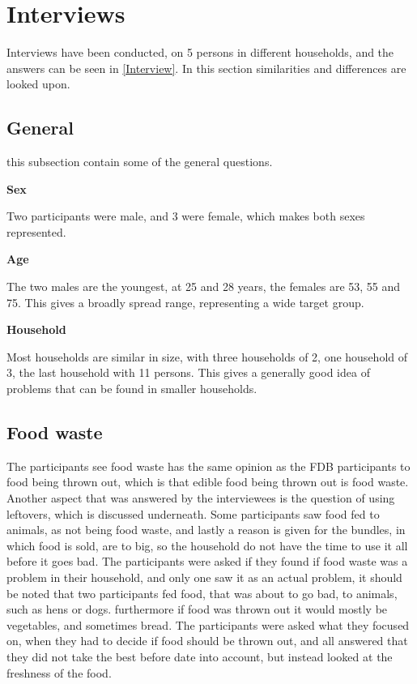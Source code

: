 \section{Interviews}
Interviews have been conducted, on 5 persons in different households, and the answers can be seen in \cref{Interview}. In this section similarities and differences are looked upon.

\subsection{General}
this subsection contain some of the general questions.

\textbf{Sex}

Two participants were male, and 3 were female, which makes both sexes represented.

\textbf{Age}

The two males are the youngest, at 25 and 28 years, the females are 53, 55 and 75. This gives a broadly spread range, representing a wide target group.

\textbf{Household}

Most households are similar in size, with three households of 2, one household of 3, the last household with 11 persons. This gives a generally good idea of problems that can be found in smaller households.

\subsection{Food waste}
The participants see food waste has the same opinion as the FDB participants to food being thrown out, which is that edible food being thrown out is food waste. Another aspect that was answered by the interviewees is the question of using leftovers, which is discussed underneath. Some participants saw food fed to animals, as not being food waste, and lastly a reason is given for the bundles, in which food is sold, are to big, so the household do not have the time to use it all before it goes bad. The participants were asked if they found if food waste was a problem in their household, and only one saw it as an actual problem, it should be noted that two participants fed food, that was about to go bad,  to animals, such as hens or dogs. furthermore if food was thrown out it would mostly be vegetables, and sometimes bread. The participants were asked what they focused on, when they had to decide if food should be thrown out, and all answered that they did not take the best before date into account, but instead looked at the freshness of the food.

